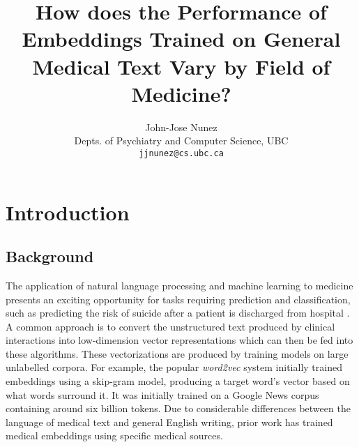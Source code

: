 \documentclass[10pt]{article}
\title{How does the Performance of Embeddings Trained on General Medical Text Vary by Field of Medicine?}
\author{John-Jose Nunez\\
  Depts. of Psychiatry and Computer Science, UBC\\
  {\tt jjnunez@cs.ubc.ca} 
}
\date{}
\begin{document}
\maketitle

\section{Introduction}

\subsection{Background}



The application of natural language processing and machine learning to medicine presents an exciting opportunity for tasks requiring prediction and classification, such as predicting the risk of suicide after a patient is discharged from hospital \cite{mccoyImprovingPredictionSuicide2016}. A common approach is to convert the unstructured text produced by clinical interactions into low-dimension vector representations which can then be fed into these algorithms. These vectorizations are produced by training models on large unlabelled corpora. For example, the popular \emph{word2vec} system \cite{mikolovEfficientEstimationWord2013} initially trained embeddings using a skip-gram model, producing a target word's vector based on what words surround it. It was initially trained on a Google News corpus containing around six billion tokens. Due to considerable differences between the language of medical text and general English writing, prior work has trained medical embeddings using specific medical sources. 
\end{document}

